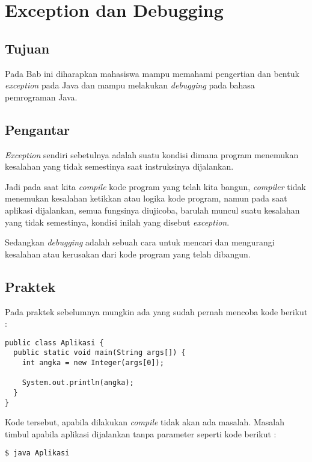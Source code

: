 \chapter{Exception dan Debugging}

\section{Tujuan}

Pada Bab ini diharapkan mahasiswa mampu memahami pengertian dan bentuk \textit{exception} pada Java dan mampu melakukan \textit{debugging} pada bahasa pemrograman Java.

\section{Pengantar}

\textit{Exception} sendiri sebetulnya adalah suatu kondisi dimana program menemukan kesalahan yang tidak semestinya saat instruksinya dijalankan. 

Jadi pada saat kita \textit{compile} kode program yang telah kita bangun, \textit{compiler} tidak menemukan kesalahan ketikkan atau logika kode program, namun pada saat aplikasi dijalankan, semua fungsinya diujicoba, barulah muncul suatu kesalahan yang tidak semestinya, kondisi inilah yang disebut \textit{exception}. 

Sedangkan \textit{debugging} adalah sebuah cara untuk mencari dan mengurangi kesalahan atau kerusakan dari kode program yang telah dibangun.

\section{Praktek}

Pada praktek sebelumnya mungkin ada yang sudah pernah mencoba kode berikut :

\begin{lstlisting}
public class Aplikasi {
  public static void main(String args[]) {
    int angka = new Integer(args[0]);
    
    System.out.println(angka);
  }
}
\end{lstlisting}

Kode tersebut, apabila dilakukan \textit{compile} tidak akan ada masalah. Masalah timbul apabila aplikasi dijalankan tanpa parameter seperti kode berikut :

\begin{lstlisting}
$ java Aplikasi
\end{lstlisting}

